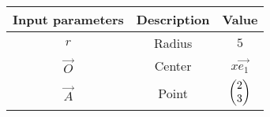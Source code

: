     \begin{tabular}{|c|c|c|}
    \hline
         \textbf{Input parameters}& \textbf{Description}&\textbf{Value} \\
         \hline
         $r$ & Radius&$5$ \\
        \hline
        $\vec{O}$ & Center&$x\vec{e_1}$ \\
        \hline
       $\vec{A}$&Point &$\begin{pmatrix}2\\3\end{pmatrix}$ \\
       \hline
    \end{tabular}
